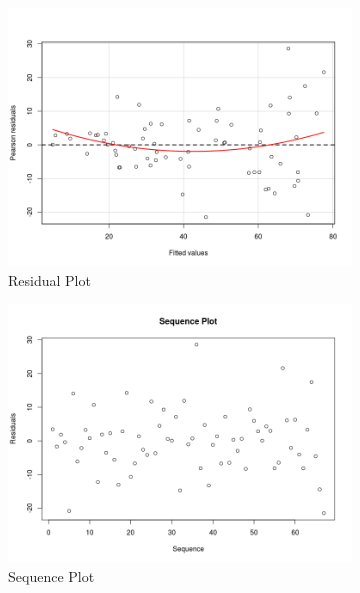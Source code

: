 \documentclass[]{article}
\begin{document}
\begin{figure}[!ht]
\begin{subfigure}{.5\textwidth}
  \centering
  \includegraphics[width=\linewidth]{residPlot6.png}
  \caption{Residual Plot}
  \label{fig6_2:resid}
\end{subfigure}%
\begin{subfigure}{.5\textwidth}
  \centering
  \includegraphics[width=\linewidth]{seqPlot6.png}
  \caption{Sequence Plot}
  \label{fig6_2:seq}
\end{subfigure}
\begin{subfigure}{.5\textwidth}
  \centering

\end{subfigure}
\end{figure}
\end{document}
